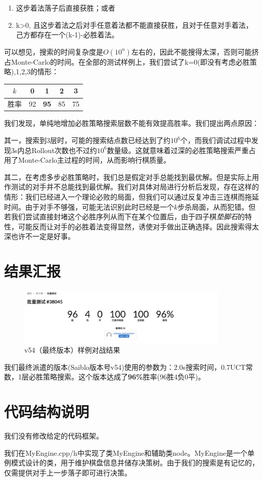 \documentclass{article}
\begin{document}
	\begin{enumerate}
		\item 这步着法落子后直接获胜；或者
		\item k>0, 且这步着法之后对手任意着法都不能直接获胜，且对于任意对手着法，己方都存在一个(k-1)-必胜着法。
	\end{enumerate}
	
	可以想见，搜索的时间复杂度是$O(10^n)$左右的，因此不能搜得太深，否则可能挤占Monte-Carlo的时间。在全部的测试样例上，我们尝试了k=0(即没有考虑必胜策略),1,2,3的情形：
	
	\begin{table}[h]
		\centering
		\begin{tabular}{||c|c|c|c|c||}
			\hline $k$&0&1&2&3 \\
			\hline 胜率&92&\textbf{95}&85&75\\
			\hline
		\end{tabular}
	\end{table}

	我们发现，单纯地增加必胜策略搜索层数不能有效提高胜率。我们提出两点原因：
	
	其一，搜索到3层时，可能的搜索结点数已经达到了约$10^6$个，而我们调试过程中发现3s内总Rollout次数也不过约$10^6$数量级。这就意味着过深的必胜策略搜索严重占用了Monte-Carlo主过程的时间，从而影响行棋质量。
	
	其二，在考虑多步必胜策略时，我们总是假定对手总能找到最优解。但是实际上用作测试的对手并不总能找到最优解。我们对具体对局进行分析后发现，存在这样的情形：我们已经进入一个理论必败的局面，但我们可以通过反复冲击三连棋而拖延时间。由于对手不够强，可能无法识别此时已经是一个$k$步杀局面，从而犯错。但若我们尝试直接封堵这个必胜序列从而下在某个位置后，由于四子棋\textit{垫脚石}的特性，可能反而让对手的必胜着法变得显然，诱使对手做出正确选择。因此搜索得太深也许不一定是好事。
	
	\section{结果汇报}
	
	\begin{figure}[ht]
		\centering
		\includegraphics[width=0.9\textwidth]{v54result}
		\caption{v54（最终版本）样例对战结果}
	\end{figure}
	
	我们最终派遣的版本(Saiblo版本号v54)使用的参数为：2.0s搜索时间，0.7UCT常数，1层必胜策略搜索。这个版本达成了\textbf{96\%}胜率(96胜4负0平)。
	
	\section{代码结构说明}
	
	我们没有修改给定的代码框架。
	
	我们在MyEngine.cpp/h中实现了类MyEngine和辅助类node。MyEngine是一个单例模式设计的类，用于维护棋盘信息并储存决策树。由于我们的搜索是有记忆的，仅需提供对手上一步落子即可进行决策。
\end{document}
